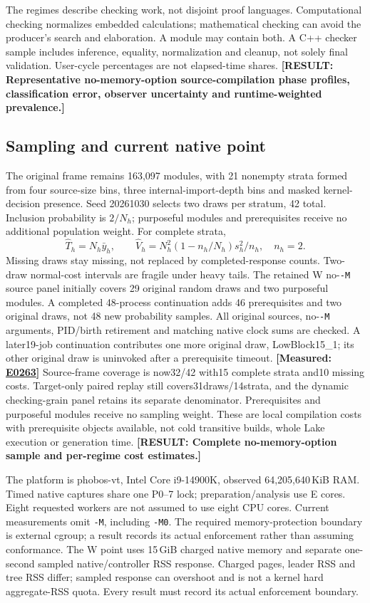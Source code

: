 \documentclass[10pt,twocolumn]{article}
\newcommand{\missing}[1]{\textbf{[RESULT: #1]}}
\newcommand{\measured}[1]{\textbf{[Measured: #1]}}
\newcommand{\expref}[2]{\href{https://github.com/yunwei37/proofserve/blob/main/docs/tmp/build-and-evaluate/step-#1/step-report.md}{E#2}}
\begin{document}
The regimes describe checking work, not disjoint proof languages.
Computational checking normalizes embedded calculations; mathematical
checking can avoid the producer's search and elaboration.
A module may contain both. A C++ checker sample includes inference, equality,
normalization and cleanup, not solely final validation.
User-cycle percentages are not elapsed-time shares.
\missing{Representative no-memory-option source-compilation phase profiles,
classification error, observer uncertainty and runtime-weighted prevalence.}

\subsection{Sampling and current native point}
The original frame remains 163,097 modules, with 21 nonempty strata formed
from four source-size bins, three internal-import-depth bins and
masked kernel-decision presence.
Seed 20261030 selects two draws per stratum, 42 total.
Inclusion probability is $2/N_h$; purposeful modules and prerequisites
receive no additional population weight.
For complete strata,
\[
\widehat T_h=N_h\bar y_h,\qquad
\widehat V_h=N_h^2(1-n_h/N_h)s_h^2/n_h,\quad n_h=2.
\]
Missing draws stay missing, not replaced by completed-response counts.
Two-draw normal-cost intervals are fragile under heavy tails.
The retained W no-\texttt{-M} source panel initially covers 29 original
random draws and two purposeful modules.
A completed 48-process continuation adds 46 prerequisites and two original
draws, not 48 new probability samples.
All original sources, no-\texttt{-M} arguments, PID/birth retirement and
matching native clock sums are checked.
A later19-job continuation contributes one more original draw, LowBlock15_1;
its other original draw is uninvoked after a prerequisite timeout.
\measured{\expref{0263-20261102T040256+0000}{0263}}
Source-frame coverage is now32/42 with15 complete strata and10 missing
costs. Target-only paired replay still covers31draws/14strata, and the
dynamic checking-grain panel retains its separate denominator.
Prerequisites and purposeful modules receive no sampling weight.
These are local compilation costs with prerequisite objects available,
not cold transitive builds, whole Lake execution or generation time.
\missing{Complete no-memory-option sample and per-regime cost estimates.}

The platform is phobos-vt, Intel Core i9-14900K,
observed 64,205,640\,KiB RAM.
Timed native captures share one P0--7 lock; preparation/analysis use E cores.
Eight requested workers are not assumed to use eight CPU cores.
Current measurements omit \texttt{-M}, including \texttt{-M0}.
The required memory-protection boundary is external cgroup;
a result records its actual enforcement rather than assuming conformance.
The W point uses 15\,GiB charged native memory and separate one-second
sampled native/controller RSS response.
Charged pages, leader RSS and tree RSS differ; sampled response can overshoot
and is not a kernel hard aggregate-RSS quota.
Every result must record its actual enforcement boundary.
\end{document}
